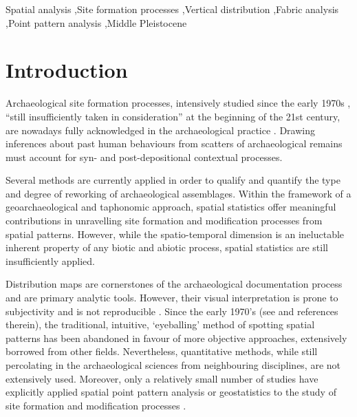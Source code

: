 \documentclass[preprint,authoryear,times]{elsarticle} %
\begin{document}
\begin{frontmatter}
  \begin{keyword}
    Spatial analysis \sep Site formation processes \sep Vertical distribution \sep Fabric analysis \sep Point pattern analysis \sep Middle Pleistocene
  \end{keyword}
  
\end{frontmatter}

\linenumbers

\section{Introduction}

Archaeological site formation processes, intensively studied since the early 1970s \citep[][among others]{Isaac1967,Schiffer1972,Schiffer1983,Schiffer1987,Shackley1978,Wood1978,Binford1981,Schick1984,Schick1986,Schick1987,Petraglia1987,Petraglia1994}, ``still insufficiently taken in consideration'' \citep[][p.379]{Texier2000} at the beginning of the 21st century, are nowadays fully acknowledged in the archaeological practice \citep[][among others]{Villa2004,Bailey2007,Brantingham2007,Malinsky-Buller2011,Vaquero2012,Bargallo2016}. Drawing inferences about past human behaviours from scatters of archaeological remains must account for syn- and post-depositional contextual processes.

Several methods are currently applied in order to qualify and quantify the type and degree of reworking of archaeological assemblages. Within the framework of a geoarchaeological and taphonomic approach, spatial statistics offer meaningful contributions in unravelling site formation and modification processes from spatial patterns. However, while the spatio-temporal dimension is an ineluctable inherent property of any biotic and abiotic process, spatial statistics are still insufficiently applied.

Distribution maps are cornerstones of the archaeological documentation process and are primary analytic tools. However, their visual interpretation is prone to subjectivity and is not reproducible \citep{Bevan2013a}. Since the early 1970's (see \cite{Hodder1976,Orton1982} and references therein), the traditional, intuitive, `eyeballing' method of spotting spatial patterns has been abandoned in favour of more objective approaches, extensively borrowed from other fields. Nevertheless, quantitative methods, while still percolating in the archaeological sciences from neighbouring disciplines, are not extensively used. Moreover, only a relatively small number of studies have explicitly applied spatial point pattern analysis or geostatistics to the study of site formation and modification processes \citep[][but see \cite{Hivernel1984} for an earlier work on the subject]{Lenoble2008,Dominguez-Rodrigo2014b,Dominguez-Rodrigo2014c,Dominguez-Rodrigo2017,Carrer2015,Giusti2016,Organista2017}.
\end{document}
